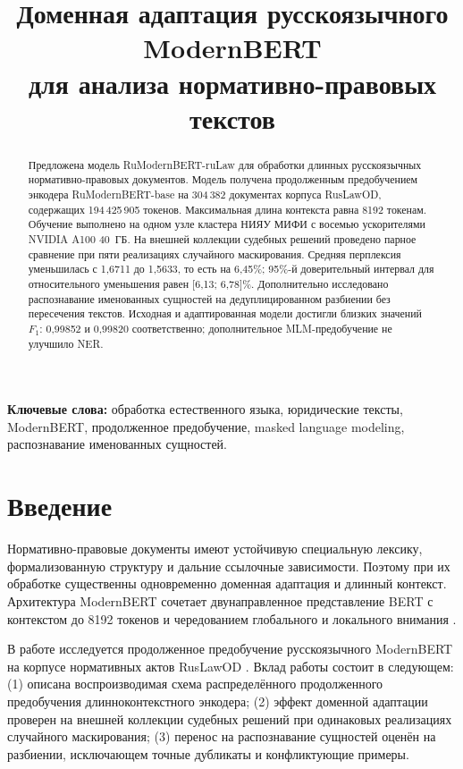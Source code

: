 \documentclass[12pt,a4paper]{article}
\title{\textbf{Доменная адаптация русскоязычного ModernBERT\\для анализа нормативно-правовых текстов}}
\author{}
\date{}
\newcommand{\model}{RuModernBERT-ruLaw}
\newcommand{\base}{RuModernBERT-base}
\begin{document}
\maketitle
\begin{abstract}
Предложена модель \model{} для обработки длинных русскоязычных нормативно-правовых документов. Модель получена продолженным предобучением энкодера \base{} на 304\,382 документах корпуса RusLawOD, содержащих 194\,425\,905 токенов. Максимальная длина контекста равна 8192 токенам. Обучение выполнено на одном узле кластера НИЯУ МИФИ с восемью ускорителями NVIDIA A100 40~ГБ. На внешней коллекции судебных решений проведено парное сравнение при пяти реализациях случайного маскирования. Средняя перплексия уменьшилась с 1{,}6711 до 1{,}5633, то есть на 6{,}45\%; 95\%-й доверительный интервал для относительного уменьшения равен [6{,}13; 6{,}78]\%. Дополнительно исследовано распознавание именованных сущностей на дедуплицированном разбиении без пересечения текстов. Исходная и адаптированная модели достигли близких значений $F_1$: 0{,}99852 и 0{,}99820 соответственно; дополнительное MLM-предобучение не улучшило NER.
\end{abstract}
\noindent\textbf{Ключевые слова:} обработка естественного языка, юридические тексты, ModernBERT, продолженное предобучение, masked language modeling, распознавание именованных сущностей.

\section{Введение}
Нормативно-правовые документы имеют устойчивую специальную лексику, формализованную структуру и дальние ссылочные зависимости. Поэтому при их обработке существенны одновременно доменная адаптация и длинный контекст. Архитектура ModernBERT сочетает двунаправленное представление BERT \cite{devlin2019bert} с контекстом до 8192 токенов и чередованием глобального и локального внимания \cite{warner2024modernbert}.

В работе исследуется продолженное предобучение русскоязычного ModernBERT на корпусе нормативных актов RusLawOD \cite{saveliev2024corpus}. Вклад работы состоит в следующем: (1) описана воспроизводимая схема распределённого продолженного предобучения длинноконтекстного энкодера; (2) эффект доменной адаптации проверен на внешней коллекции судебных решений при одинаковых реализациях случайного маскирования; (3) перенос на распознавание сущностей оценён на разбиении, исключающем точные дубликаты и конфликтующие примеры.
\end{document}
